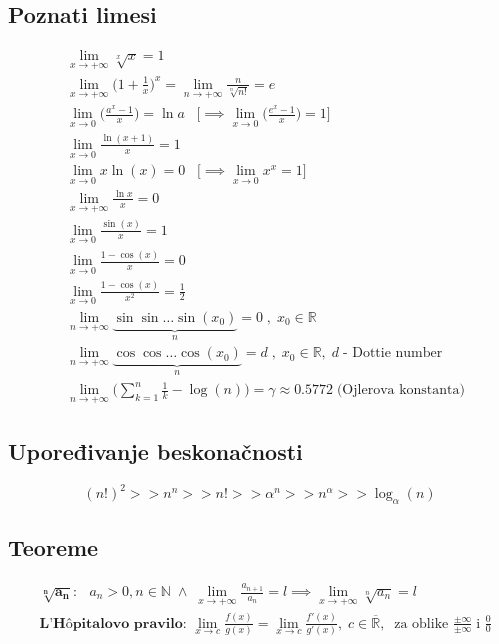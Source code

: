 \documentclass[a4paper,12pt,twoside]{report}
\numberwithin{algorithm}{section}
\begin{document}
\subsection{Poznati limesi}
\[
    \begin{aligned}
        &\lim_{x \to +\infty} \sqrt[x]{x} = 1 \\
        &\lim_{x \to +\infty} \bigg(1 + \frac{1}{x}\bigg)^x = \lim_{n \to +\infty} \frac{n}{\sqrt[n]{n!}} = e \\
        &\lim_{x \to 0} \bigg(\frac{a^x-1}{x} \bigg)  = \ln a \;\;\;\Bigg[\implies \lim_{x \to 0} \bigg(\frac{e^x-1}{x} \bigg) = 1 \Bigg]\\
        &\lim_{x \to 0} \frac{\ln (x+1)}{x} = 1\\
        &\lim_{x \to 0} x  \ln (x) = 0 \;\;\;\Bigg[\implies \lim_{x \to 0} x^x = 1 \Bigg]\\
        &\lim_{x \to +\infty} \frac{\ln x}{x} = 0 \\
        &\lim_{x \to 0} \frac{\sin(x)}{x} = 1 \\
        &\lim_{x \to 0} \frac{1 - \cos(x)}{x} = 0 \\
        &\lim_{x \to 0} \frac{1 - \cos(x)}{x^2} = \frac{1}{2}\\
        &\lim_{n \to +\infty} \underbrace{\sin \sin \dots \sin(x_0)}_{n} = 0\;,\; x_0 \in \mathbb{R}\\
        &\lim_{n \to +\infty} \underbrace{\cos \cos \dots \cos(x_0)}_{n} = d\;,\; x_0 \in \mathbb{R}, \; d\;\text{- Dottie number}\\
        &\lim_{n \to +\infty} \bigg(\sum_{k = 1}^{n} \frac{1}{k} - \log(n) \bigg) = \gamma \approx 0.5772 \; \text{(Ojlerova konstanta)}
    \end{aligned}
\]
\subsection{Upoređivanje beskonačnosti}
\[
    (n!)^2 >> n^n >> n!>>\alpha^n>>n^\alpha >> \log_\alpha (n)  %
\]
\subsection{Teoreme}
\[\begin{aligned}
    &\textbf{$\mathbf{\sqrt[n]{a_n}}$: }\;\;a_n > 0, n \in \mathbb{N} \; \land \; \lim_{x\to +\infty} \frac{a_{n+1}}{a_n} = l \implies \lim_{x\to +\infty} \sqrt[n]{a_n} = l \\
    &\textbf{L'Hôpitalovo pravilo: } \lim_{x \to c} \frac{f(x)}{g(x)} = \lim_{x \to c} \frac{f'(x)}{g'(x)},\; c \in \overline{\mathbb{R}} ,\;\; \text{za oblike } \frac{\pm \infty}{\pm \infty} \;\text{i } \frac{0}{0}
\end{aligned}\]
\end{document}
